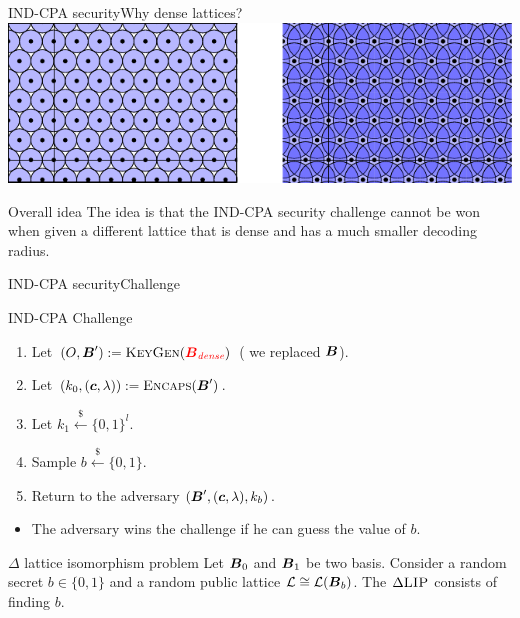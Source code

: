 \documentclass[10pt]{beamer}
\begin{document}
\begin{frame}{IND-CPA security}{Why dense lattices?}
				\includegraphics{figures/dense-lattice.pdf}
				\begin{block}{Overall idea}
								The idea is that the IND-CPA security challenge cannot be won when given a different lattice that is dense and has a much smaller decoding radius.
				\end{block}

\end{frame}


\begin{frame}{IND-CPA security}{Challenge}
				\begin{block}{IND-CPA Challenge}
								\begin{enumerate}
												\item Let $(O, \boldsymbol{B}') := \textsc{KeyGen}({\color{red}\boldsymbol{B}_{\textit{dense}}})$ ({\color{red} we replaced $\boldsymbol{B}$}).
												\item Let $(k_{0}, (\boldsymbol{c}, \lambda)) := \textsc{Encaps}(\boldsymbol{B}')$.
												\item Let $k_{1} \xleftarrow{\$} \{0, 1\}^{l}$.
												\item Sample $b \xleftarrow{\$} \{0, 1\}$.
												\item Return to the adversary $(\boldsymbol{B}', (\boldsymbol{c}, \lambda), k_{b})$.
								\end{enumerate}

								\begin{itemize}
												\item The adversary wins the challenge if he can guess the value of $b$.
								\end{itemize}
				\end{block}

				\begin{block}{$\Delta$ lattice isomorphism problem} Let $\boldsymbol{B}_{0}$ and $\boldsymbol{B}_{1}$ be two basis. Consider a random secret $b \in \{0, 1\}$ and a random public lattice $\mathcal{L} \cong \mathcal{L}(\boldsymbol{B}_{b})$. The $\Delta\textsc{LIP}$ consists of finding $b$.
				\end{block}

\end{frame}
\end{document}
